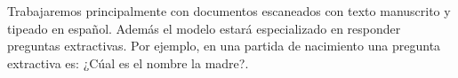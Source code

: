 \documentclass[../main.tex]{subfiles}
\begin{document}
%
%


Trabajaremos principalmente con documentos escaneados con texto manuscrito y tipeado en español.
Además el modelo estará especializado en responder preguntas extractivas.
Por ejemplo, en una partida de nacimiento una pregunta extractiva es: ¿Cúal es el nombre la madre?.


\end{document}
